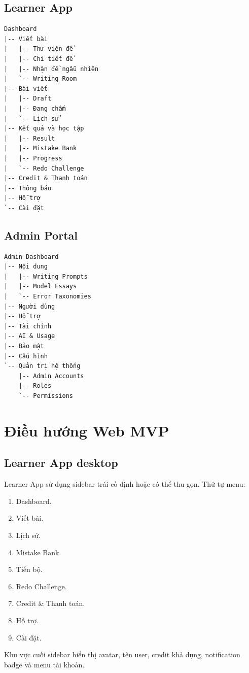 \documentclass[11pt,a4paper]{article}
\begin{document}
\subsection{Learner App}
\begin{verbatim}
Dashboard
|-- Viết bài
|   |-- Thư viện đề
|   |-- Chi tiết đề
|   |-- Nhận đề ngẫu nhiên
|   `-- Writing Room
|-- Bài viết
|   |-- Draft
|   |-- Đang chấm
|   `-- Lịch sử
|-- Kết quả và học tập
|   |-- Result
|   |-- Mistake Bank
|   |-- Progress
|   `-- Redo Challenge
|-- Credit & Thanh toán
|-- Thông báo
|-- Hỗ trợ
`-- Cài đặt
\end{verbatim}

\subsection{Admin Portal}
\begin{verbatim}
Admin Dashboard
|-- Nội dung
|   |-- Writing Prompts
|   |-- Model Essays
|   `-- Error Taxonomies
|-- Người dùng
|-- Hỗ trợ
|-- Tài chính
|-- AI & Usage
|-- Bảo mật
|-- Cấu hình
`-- Quản trị hệ thống
    |-- Admin Accounts
    |-- Roles
    `-- Permissions
\end{verbatim}

\section{Điều hướng Web MVP}

\subsection{Learner App desktop}
Learner App sử dụng sidebar trái cố định hoặc có thể thu gọn. Thứ tự menu:
\begin{enumerate}
  \item Dashboard.
  \item Viết bài.
  \item Lịch sử.
  \item Mistake Bank.
  \item Tiến bộ.
  \item Redo Challenge.
  \item Credit \& Thanh toán.
  \item Hỗ trợ.
  \item Cài đặt.
\end{enumerate}

Khu vực cuối sidebar hiển thị avatar, tên user, credit khả dụng, notification badge và menu tài khoản.
\end{document}
